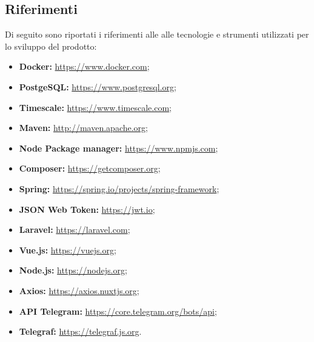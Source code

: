 	\subsection{Riferimenti}
		Di seguito sono riportati i riferimenti alle alle tecnologie e strumenti utilizzati per lo sviluppo del prodotto:
		\begin{itemize}
			\item \textbf{Docker:} \url{https://www.docker.com};
			\item \textbf{PostgeSQL:} \url{https://www.postgresql.org};
			\item \textbf{Timescale:} \url{https://www.timescale.com};
			\item \textbf{Maven:} \url{http://maven.apache.org};
			\item \textbf{Node Package manager:} \url{https://www.npmjs.com};
			\item \textbf{Composer:} \url{https://getcomposer.org};
			\item \textbf{Spring:} \url{https://spring.io/projects/spring-framework};
			\item \textbf{JSON Web Token:} \url{https://jwt.io};
			\item \textbf{Laravel:} \url{https://laravel.com};
			\item \textbf{Vue.js:} \url{https://vuejs.org};
			\item \textbf{Node.js:} \url{https://nodejs.org};
			\item \textbf{Axios:} \url{https://axios.nuxtjs.org};
			\item \textbf{API Telegram:} \url{https://core.telegram.org/bots/api};
			\item \textbf{Telegraf:} \url{https://telegraf.js.org}. 
		\end{itemize}
